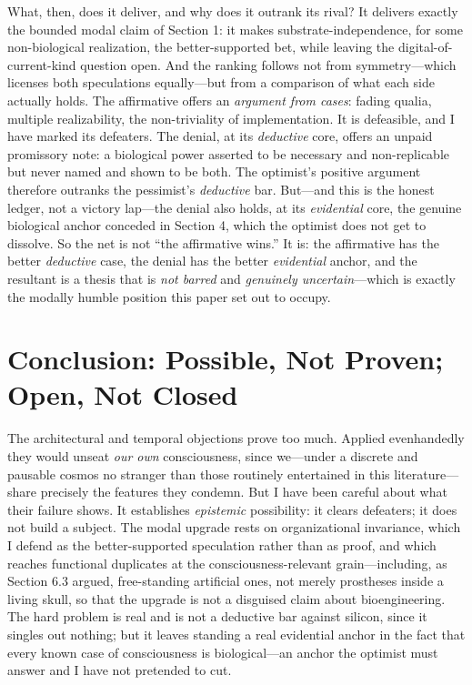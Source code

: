 \documentclass[11pt]{article}
\begin{document}
What, then, does it deliver, and why does it outrank its rival? It delivers exactly the bounded modal claim of Section 1: it makes substrate-independence, for some non-biological realization, the better-supported bet, while leaving the digital-of-current-kind question open. And the ranking follows not from symmetry---which licenses both speculations equally---but from a comparison of what each side actually holds. The affirmative offers an \emph{argument from cases}: fading qualia, multiple realizability, the non-triviality of implementation. It is defeasible, and I have marked its defeaters. The denial, at its \emph{deductive} core, offers an unpaid promissory note: a biological power asserted to be necessary and non-replicable but never named and shown to be both. The optimist's positive argument therefore outranks the pessimist's \emph{deductive} bar. But---and this is the honest ledger, not a victory lap---the denial also holds, at its \emph{evidential} core, the genuine biological anchor conceded in Section 4, which the optimist does not get to dissolve. So the net is not ``the affirmative wins.'' It is: the affirmative has the better \emph{deductive} case, the denial has the better \emph{evidential} anchor, and the resultant is a thesis that is \emph{not barred} and \emph{genuinely uncertain}---which is exactly the modally humble position this paper set out to occupy.

\section{Conclusion: Possible, Not Proven; Open, Not Closed}

The architectural and temporal objections prove too much. Applied evenhandedly they would unseat \emph{our own} consciousness, since we---under a discrete and pausable cosmos no stranger than those routinely entertained in this literature---share precisely the features they condemn. But I have been careful about what their failure shows. It establishes \emph{epistemic} possibility: it clears defeaters; it does not build a subject. The modal upgrade rests on organizational invariance, which I defend as the better-supported speculation rather than as proof, and which reaches functional duplicates at the consciousness-relevant grain---including, as Section 6.3 argued, free-standing artificial ones, not merely prostheses inside a living skull, so that the upgrade is not a disguised claim about bioengineering. The hard problem is real and is not a deductive bar against silicon, since it singles out nothing; but it leaves standing a real evidential anchor in the fact that every known case of consciousness is biological---an anchor the optimist must answer and I have not pretended to cut.
\end{document}
